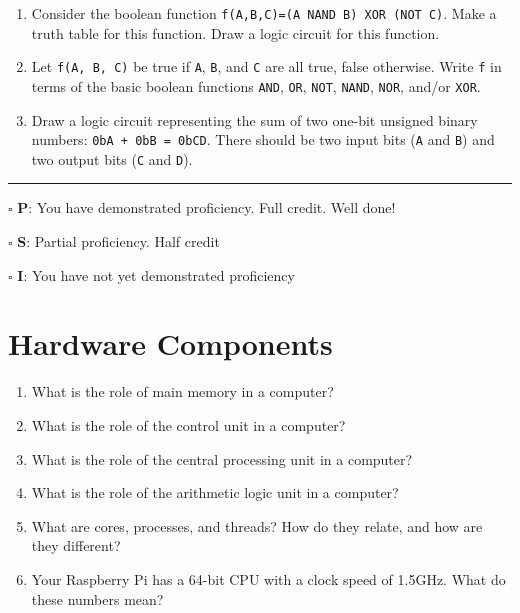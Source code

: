 \documentclass[12pt]{article}
\begin{document}
\begin{enumerate}
\item Consider the boolean function \texttt{f(A,B,C)=(A NAND B) XOR (NOT C)}. Make a truth table for this function. Draw a logic circuit for this function.

\vfill

\item Let \texttt{f(A, B, C)} be true if \texttt{A}, \texttt{B}, and \texttt{C} are all true, false otherwise. Write \texttt{f} in terms of the basic boolean functions \texttt{AND}, \texttt{OR}, \texttt{NOT}, \texttt{NAND}, \texttt{NOR}, and/or \texttt{XOR}. 
\vfill

\item Draw a logic circuit representing the sum of two one-bit unsigned binary numbers: \texttt{0bA + 0bB = 0bCD}. There should be two input bits (\texttt{A} and \texttt{B}) and two output bits (\texttt{C} and \texttt{D}). 
\vfill
\end{enumerate}

\vfill

\rule[1ex]{\textwidth}{.1pt}

$\square$ \textbf{P}: You have demonstrated proficiency. Full credit. Well done!

$\square$ \textbf{S}: Partial proficiency. Half credit

$\square$ \textbf{I}: You have not yet demonstrated proficiency

\newpage



\section*{Hardware Components}

\begin{enumerate}
\item What is the role of main memory in a computer?
\vfill

\item What is the role of the control unit in a computer?
\vfill

\item What is the role of the central processing unit in a computer?
\vfill

\item What is the role of the arithmetic logic unit in a computer?
\vfill

\item What are cores, processes, and threads? How do they relate, and how are they different?
\vfill

\item Your Raspberry Pi has a 64-bit CPU with a clock speed of 1.5GHz. What do these numbers mean?
\end{enumerate}
\end{document}
